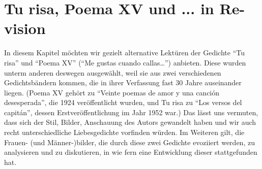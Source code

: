 \section{Tu risa, Poema XV und ... in Re-vision}

In diesem Kapitel möchten wir gezielt alternative Lektüren der Gedichte ``Tu risa'' und ``Poema XV'' (``Me gustas cuando callas\ldots'') anbieten.
Diese wurden unterm anderen deswegen ausgewählt, weil sie aus zwei verschiedenen Gedichtsbändern kommen, die in ihrer Verfassung fast 30 Jahre auseinander liegen.
(Poema XV gehört zu ``Veinte poemas de amor y una canción desesperada'', die 1924 veröffentlicht wurden, und Tu risa zu ``Los versos del capitán'', dessen Erstveröffentlichung im Jahr 1952 war.)
Das lässt uns vermuten, dass sich der Stil, Bilder, Anschauung des Autors gewandelt haben und wir auch recht unterschiedliche Liebesgedichte vorfinden würden.
Im Weiteren gilt, die Frauen- (und Männer-)bilder, die durch diese zwei Gedichte evoziiert werden, zu analysieren und zu diskutieren, in wie fern eine Entwicklung dieser stattgefunden hat.

